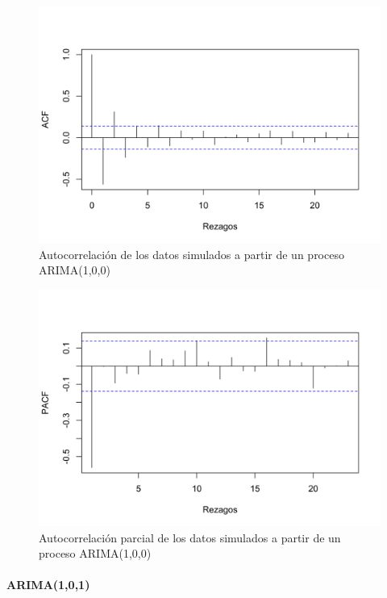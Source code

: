 \documentclass[
]{article}
\begin{document}
\begin{figure}[H]
\includegraphics[width=1\linewidth,height=1\textheight]{Tesis_files/figure-latex/arima100_acf-1} \caption{Autocorrelación de los datos simulados a partir de un proceso ARIMA(1,0,0)}\label{fig:arima100_acf}
\end{figure}

\begin{figure}[H]
\includegraphics[width=1\linewidth,height=1\textheight]{Tesis_files/figure-latex/arima100_pacf-1} \caption{Autocorrelación parcial de los datos simulados a partir de un proceso ARIMA(1,0,0)}\label{fig:arima100_pacf}
\end{figure}

\paragraph{ARIMA(1,0,1)}
\end{document}

